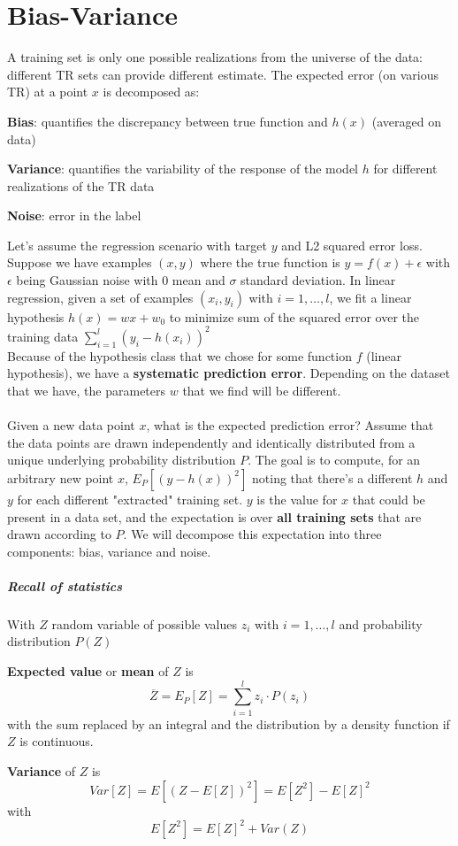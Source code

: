 \documentclass[10pt]{report}
\begin{document}
\section{Bias-Variance} A training set is only one possible realizations from the universe of the data: different TR sets can provide different estimate. The expected error (on various TR) at a point $x$ is decomposed as:
\begin{list}{}{}
	\item \textbf{Bias}: quantifies the discrepancy between true function and $h(x)$ (averaged on data)
	\item \textbf{Variance}: quantifies the variability of the response of the model $h$ for different realizations of the TR data
	\item \textbf{Noise}: error in the label
\end{list}
Let's assume the regression scenario with target $y$ and L2 squared error loss. Suppose we have examples $(x,y)$ where the true function is $y = f(x) + \epsilon$ with $\epsilon$ being Gaussian noise with 0 mean and $\sigma$ standard deviation. In linear regression, given a set of examples $(x_i,y_i)$ with $i = 1,\ldots,l$, we fit a linear hypothesis $h(x) = wx + w_0$ to minimize sum of the squared error over the training data $\sum_{i=1}^l (y_i - h(x_i))^2$\\
Because of the hypothesis class that we chose for some function $f$ (linear hypothesis), we have a \textbf{systematic prediction error}. Depending on the dataset that we have, the parameters $w$ that we find will be different.\\\\
Given a new data point $x$, what is the expected prediction error? Assume that the data points are drawn independently and identically distributed from a unique underlying probability distribution $P$. The goal is to compute, for an arbitrary new point $x$, $E_P[(y - h(x))^2]$ noting that there's a different $h$ and $y$ for each different "extracted" training set. $y$ is the value for $x$ that could be present in a data set, and the expectation is over \textbf{all training sets} that are drawn according to $P$. We will decompose this expectation into three components: bias, variance and noise.
\subparagraph{Recall of statistics} With $Z$ random variable of possible values $z_i$ with $i=1,\ldots,l$ and probability distribution $P(Z)$
\begin{list}{}{}
	\item \textbf{Expected value} or \textbf{mean} of $Z$ is $$\overline{Z} = E_P[Z] = \sum_{i=1}^l z_i\cdot P(z_i)$$ with the sum replaced by an integral and the distribution by a density function if $Z$ is continuous.
	\item \textbf{Variance} of $Z$ is $$Var[Z] = E[(Z - E[Z])^2] = E[Z^2] - E[Z]^2$$ with $$E[Z^2] = E[Z]^2 + Var(Z)$$
\end{list}
\end{document}
